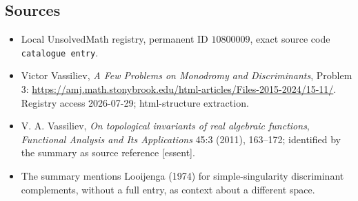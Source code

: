 \documentclass[11pt]{article}
\begin{document}
\subsection{Sources}
\begin{itemize}
\item Local UnsolvedMath registry, permanent ID \(10800009\), exact source code \texttt{catalogue entry}.
\item Victor Vassiliev, \emph{A Few Problems on Monodromy and Discriminants}, Problem 3: \url{https://amj.math.stonybrook.edu/html-articles/Files-2015-2024/15-11/}. Registry access 2026-07-29; html-structure extraction.
\item V. A. Vassiliev, \emph{On topological invariants of real algebraic functions}, \emph{Functional Analysis and Its Applications} 45:3 (2011), 163--172; identified by the summary as source reference [essent].
\item The summary mentions Looijenga (1974) for simple-singularity discriminant complements, without a full entry, as context about a different space.
\end{itemize}
\end{document}
